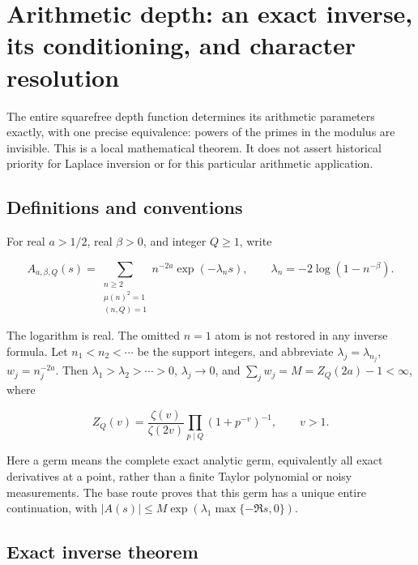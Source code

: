 \hypertarget{arithmetic-depth-an-exact-inverse-its-conditioning-and-character-resolution}{%
\chapter[Arithmetic inverse and character resolution]{Arithmetic depth: an exact inverse, its conditioning, and
character
resolution}\label{app:arithmetic}\label{arithmetic-depth-an-exact-inverse-its-conditioning-and-character-resolution}}



The entire squarefree depth function determines its arithmetic
parameters exactly, with one precise equivalence: powers of the primes
in the modulus are invisible. This is a local mathematical theorem. It
does not assert historical priority for Laplace inversion or for this
particular arithmetic application.

\hypertarget{claim-card-and-conventions}{%
\section{Definitions and conventions}\label{claim-card-and-conventions}}

For real \(a>1/2\), real \(\beta>0\), and integer \(Q\ge1\), write

\[
 A_{a,\beta,Q}(s)=\sum_{\substack{n\ge2\\ \mu(n)^2=1\\ (n,Q)=1}}
 n^{-2a}\exp(-\lambda_n s),\qquad
 \lambda_n=-2\log(1-n^{-\beta}).
\]

The logarithm is real. The omitted \(n=1\) atom is not restored in any
inverse formula. Let \(n_1<n_2<\cdots\) be the support integers, and
abbreviate \(\lambda_j=\lambda_{n_j}\), \(w_j=n_j^{-2a}\). Then
\(\lambda_1>\lambda_2>\cdots>0\), \(\lambda_j\to0\), and
\(\sum_jw_j=M=Z_Q(2a)-1<\infty\), where

\[
 Z_Q(v)=\frac{\zeta(v)}{\zeta(2v)}
          \prod_{p\mid Q}(1+p^{-v})^{-1},\qquad v>1.
\]

Here a germ means the complete exact analytic germ, equivalently all
exact derivatives at a point, rather than a finite Taylor polynomial or
noisy measurements. The base route proves that this germ has a unique
entire continuation, with
\(|A(s)|\le M\exp(\lambda_1\max\{-\Re s,0\})\).

\hypertarget{exact-inverse-theorem}{%
\section{Exact inverse theorem}\label{exact-inverse-theorem}}

